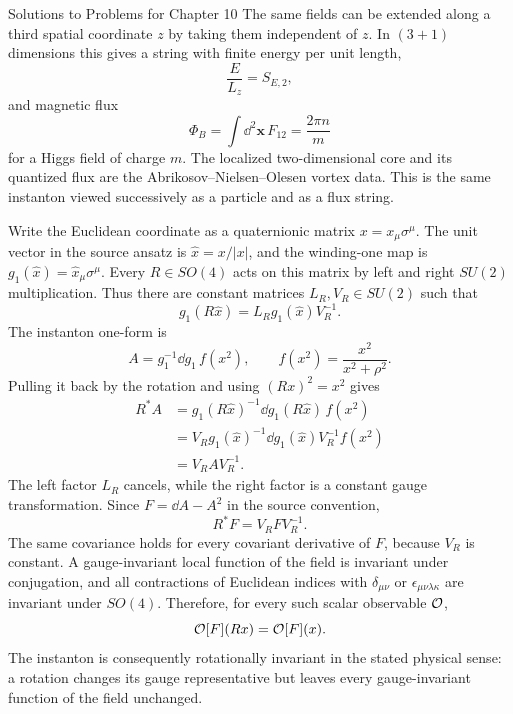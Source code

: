 \begin{bankssolutions}{Solutions to Problems for Chapter 10}
The same fields can be extended along a third spatial coordinate $z$ by taking
them independent of $z$.  In $(3+1)$ dimensions this gives a string with
finite energy per unit length,
\[
 \frac{E}{L_z}=S_{E,2},
\]
and magnetic flux
\[
  \Phi_B=\int\dd^2\mathbf x\,F_{12}=\frac{2\pi n}{m}
\]
for a Higgs field of charge $m$.  The localized two-dimensional core and its
quantized flux are the Abrikosov--Nielsen--Olesen vortex data.  This is the
same instanton viewed successively as a particle and as a flux string.

Write the Euclidean coordinate as a quaternionic matrix
$x=x_\mu\sigma^\mu$.  The unit vector in the source ansatz is
$\hat x=x/|x|$, and the winding-one map is
$g_1(\hat x)=\hat x_\mu\sigma^\mu$.  Every $R\in SO(4)$ acts on this matrix
by left and right $SU(2)$ multiplication.  Thus there are constant matrices
$L_R,V_R\in SU(2)$ such that
\[
 g_1(R\hat x)=L_Rg_1(\hat x)V_R^{-1}.
\]
The instanton one-form is
\[
 A=g_1^{-1}\dd g_1\,f(x^2),
 \qquad f(x^2)=\frac{x^2}{x^2+\rho^2}.
\]
Pulling it back by the rotation and using $(Rx)^2=x^2$ gives
\[
\begin{aligned}
 R^*A
 &=g_1(R\hat x)^{-1}\dd g_1(R\hat x)\,f(x^2)\\
 &=V_Rg_1(\hat x)^{-1}\dd g_1(\hat x)V_R^{-1}f(x^2)\\
 &=V_RA V_R^{-1}.
\end{aligned}
\]
The left factor $L_R$ cancels, while the right factor is a constant gauge
transformation.  Since $F=\dd A-A^2$ in the source convention,
\[
 R^*F=V_RF V_R^{-1}.
\]
The same covariance holds for every covariant derivative of $F$, because
$V_R$ is constant.  A gauge-invariant local function of the field is invariant
under conjugation, and all contractions of Euclidean indices with
$\delta_{\mu\nu}$ or $\epsilon_{\mu\nu\lambda\kappa}$ are invariant under
$SO(4)$.  Therefore, for every such scalar observable ${\cal O}$,
\[
 {\cal O}[F](Rx)={\cal O}[F](x).
\]
The instanton is consequently rotationally invariant in the stated physical
sense: a rotation changes its gauge representative but leaves every
gauge-invariant function of the field unchanged.

\end{bankssolutions}

